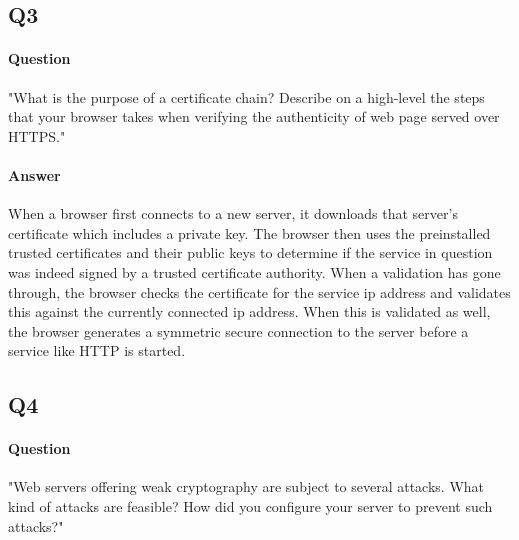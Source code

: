 \documentclass[11pt, a4paper]{article}
\begin{document}
\subsection{Q3}
\paragraph{Question}
"What is the purpose of a certificate chain? Describe on a high-level the steps that your browser takes when verifying the authenticity of web page served over HTTPS."
\paragraph{Answer}
When a browser first connects to a new server, it downloads that server's certificate which includes a private key. The browser then uses the preinstalled trusted certificates and their public keys to determine if the service in question was indeed signed by a trusted certificate authority. When a validation has gone through, the browser checks the certificate for the service ip address and validates this against the currently connected ip address. When this is validated as well, the browser generates a symmetric secure connection to the server before a service like HTTP is started. 
\subsection{Q4}
\paragraph{Question}
"Web servers offering weak cryptography are subject to several attacks. What kind of attacks are feasible? How did you configure your server to prevent such attacks?"
\end{document}
